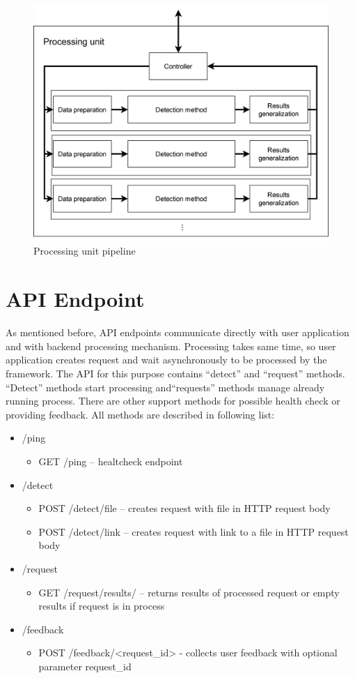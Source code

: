 \begin{figure}[H]
    \centering
    \includegraphics[width=.65\linewidth]{other-fig/framework_architecture_processing_unit.png}
    \caption{Processing unit pipeline}
\label{fig:framework_architecture_processing_unit}
\end{figure}

\section{API Endpoint}

As mentioned before, API endpoints communicate directly with user application and with backend processing mechanism. Processing takes same time, so user application creates request and wait asynchronously to be processed by the framework. The API for this purpose contains “detect” and “request” methods. “Detect” methods start processing and“requests” methods manage already running process. There are other support methods for possible health check or providing feedback. All methods are described in following list:

\begin{itemize}
\item /ping
    \begin{itemize}
    \item GET /ping – healtcheck endpoint
    \end{itemize}
\item /detect
    \begin{itemize}
    \item POST /detect/file – creates request with file in HTTP request body
    \item POST /detect/link – creates request with link to a file in HTTP request body
    \end{itemize}
\item /request
    \begin{itemize}
    \item GET /request/results/ – returns results of processed request or empty results if request is in process
    \end{itemize}
\item /feedback
    \begin{itemize}
    \item POST /feedback/<request\_id> - collects user feedback with optional parameter request\_id
    \end{itemize}
\end{itemize}


